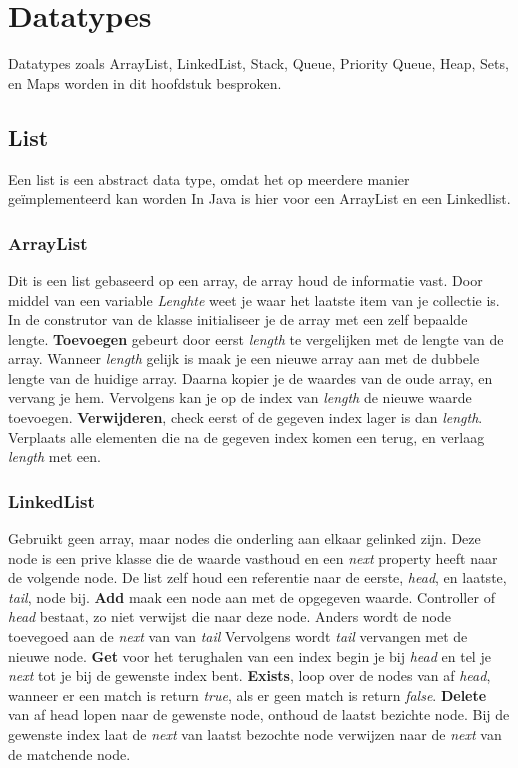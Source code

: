 \section{Datatypes}
Datatypes zoals ArrayList, LinkedList, Stack, Queue, Priority Queue, Heap, Sets, en Maps worden in dit hoofdstuk besproken.

\subsection{List}
Een list is een abstract data type, omdat het op meerdere manier geïmplementeerd kan worden
In Java is hier voor een ArrayList en een Linkedlist.

\subsubsection{ArrayList}
Dit is een list gebaseerd op een array, de array houd de informatie vast.
Door middel van een variable \textit{Lenghte} weet je waar het laatste item van je collectie is.
In de construtor van de klasse initialiseer je de array met een zelf bepaalde lengte.
\textbf{Toevoegen} gebeurt door eerst \textit{length} te vergelijken met de lengte van de array.
Wanneer \textit{length} gelijk is maak je een nieuwe array aan met de dubbele lengte van de huidige array.
Daarna kopier je de waardes van de oude array, en vervang je hem.
Vervolgens kan je op de index van \textit{length} de nieuwe waarde toevoegen.
\textbf{Verwijderen}, check eerst of de gegeven index lager is dan \textit{length}.
Verplaats alle elementen die na de gegeven index komen een terug, en verlaag \textit{length} met een.

\subsubsection{LinkedList}
Gebruikt geen array, maar nodes die onderling aan elkaar gelinked zijn.
Deze node is een prive klasse die de waarde vasthoud en een \textit{next} property heeft naar de volgende node.
De list zelf houd een referentie naar de eerste, \textit{head}, en laatste, \textit{tail}, node bij.
\textbf{Add} maak een node aan met de opgegeven waarde.
Controller of \textit{head} bestaat, zo niet verwijst die naar deze node.
Anders wordt de node toevegoed aan de \textit{next} van van \textit{tail}
Vervolgens wordt \textit{tail} vervangen met de nieuwe node.
\textbf{Get} voor het terughalen van een index begin je bij \textit{head} en tel je \textit{next} tot je bij de gewenste index bent.
\textbf{Exists}, loop over de nodes van af \textit{head}, wanneer er een match is return \textit{true}, als er geen match is return \textit{false}.
\textbf{Delete} van af head lopen naar de gewenste node, onthoud de laatst bezichte node. Bij de gewenste index laat de \textit{next} van laatst bezochte node verwijzen naar de \textit{next} van de matchende node.

